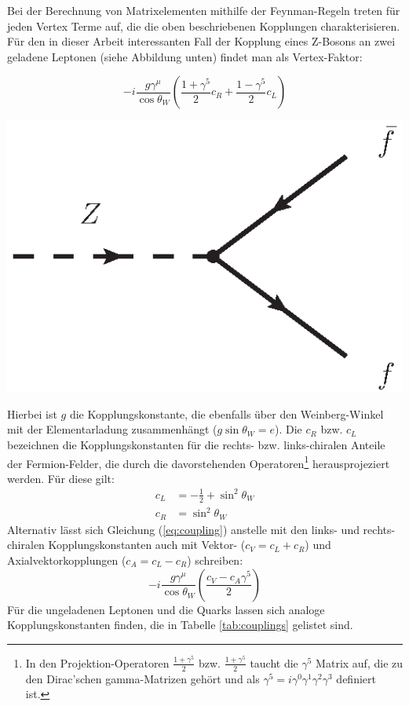 Bei der Berechnung von Matrixelementen mithilfe der Feynman-Regeln treten
für jeden Vertex Terme auf, die die oben beschriebenen Kopplungen
charakterisieren. Für den in dieser Arbeit interessanten Fall der Kopplung
eines Z-Bosons an zwei geladene Leptonen (siehe Abbildung
unten) findet man als Vertex-Faktor: \\
\begin{minipage}{0.6\textwidth}
\begin{equation}
    -i \frac{g\gamma^\mu}{\cos\theta_W} \left( \frac{1+\gamma^5}{2} c_R
        + \frac{1-\gamma^5}{2} c_L \right)
    \label{eq:coupling}
\end{equation}
\end{minipage}
\hfill
\begin{minipage}{0.3\textwidth}
    \includegraphics[width=1.0\textwidth]{img/NCvertex}
\end{minipage}
\newline

Hierbei ist $g$ die Kopplungskonstante, die ebenfalls über den Weinberg-Winkel
mit der Elementarladung zusammenhängt ($g\sin\theta_W=e$). Die $c_R$ bzw.
$c_L$ bezeichnen die Kopplungskonstanten für die rechts- bzw. links-chiralen
Anteile der Fermion-Felder, die durch die davorstehenden Operatoren\footnote{In
den Projektion-Operatoren $\frac{1+\gamma^5}{2}$ bzw. $\frac{1+\gamma^5}{2}$
taucht die $\gamma^5$ Matrix auf, die zu den Dirac'schen gamma-Matrizen gehört
und als $\gamma^5=i\gamma^0\gamma^1\gamma^2\gamma^3$ definiert ist.}
herausprojeziert werden. Für diese gilt:
\begin{align}
    c_L &= - \frac{1}{2} + \sin^2\theta_W   \\
    c_R &= \sin^2\theta_W
\end{align}
Alternativ lässt sich Gleichung (\ref{eq:coupling}) anstelle mit den links-
und rechts-chiralen Kopplungskonstanten auch mit Vektor- ($c_V=c_L+c_R$) und
Axialvektorkopplungen ($c_A=c_L-c_R$) schreiben:
\begin{equation}
    -i \frac{g\gamma^\mu}{\cos\theta_W} \left( \frac{c_V-c_A\gamma^5}{2}\right)
    \label{eq:vertex}
\end{equation}
Für die ungeladenen Leptonen und die Quarks lassen sich analoge
Kopplungskonstanten finden, die in Tabelle \ref{tab:couplings} gelistet sind.

